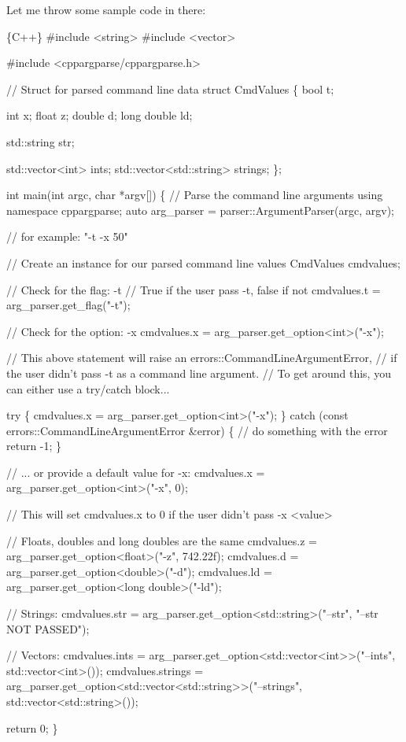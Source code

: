 Let me throw some sample code in there\+: 
\begin{DoxyCode}
\{C++\}
#include <string>
#include <vector>

#include <cppargparse/cppargparse.h>


// Struct for parsed command line data
struct CmdValues
\{
    bool t;

    int x;
    float z;
    double d;
    long double ld;

    std::string str;

    std::vector<int> ints;
    std::vector<std::string> strings;
\};



int main(int argc, char *argv[])
\{
    // Parse the command line arguments
    using namespace cppargparse;
    auto arg\_parser = parser::ArgumentParser(argc, argv);

    // for example: "-t -x 50"


    // Create an instance for our parsed command line values
    CmdValues cmdvalues;

    // Check for the flag: -t
    // True if the user pass -t, false if not
    cmdvalues.t = arg\_parser.get\_flag("-t");


    // Check for the option: -x
    cmdvalues.x = arg\_parser.get\_option<int>("-x");

    // This above statement will raise an errors::CommandLineArgumentError,
    // if the user didn't pass -t as a command line argument.
    // To get around this, you can either use a try/catch block...

    try
    \{
        cmdvalues.x = arg\_parser.get\_option<int>("-x");
    \}
    catch (const errors::CommandLineArgumentError &error)
    \{
        // do something with the error
        return -1;
    \}

    // ... or provide a default value for -x:
    cmdvalues.x = arg\_parser.get\_option<int>("-x", 0);

    // This will set cmdvalues.x to 0 if the user didn't pass -x <value>


    // Floats, doubles and long doubles are the same
    cmdvalues.z = arg\_parser.get\_option<float>("-z", 742.22f);
    cmdvalues.d = arg\_parser.get\_option<double>("-d");
    cmdvalues.ld = arg\_parser.get\_option<long double>("-ld");


    // Strings:
    cmdvalues.str = arg\_parser.get\_option<std::string>("--str", "--str NOT PASSED");


    // Vectors:
    cmdvalues.ints = arg\_parser.get\_option<std::vector<int>>("--ints", std::vector<int>());
    cmdvalues.strings = arg\_parser.get\_option<std::vector<std::string>>("--strings",
       std::vector<std::string>());


    return 0;
\}
\end{DoxyCode}


